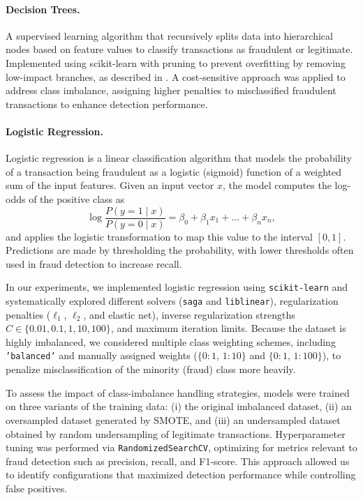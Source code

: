 \documentclass{article}
\begin{document}
    \paragraph{Decision Trees.} A supervised learning algorithm that recursively splits data into hierarchical nodes based on feature values to classify transactions as fraudulent or legitimate. Implemented using scikit-learn with pruning to prevent overfitting by removing low-impact branches, as described in \cite{tiwari2021credit}. A cost-sensitive approach was applied to address class imbalance, assigning higher penalties to misclassified fraudulent transactions to enhance detection performance.
    \paragraph{Logistic Regression.} 
Logistic regression is a linear classification algorithm that models the probability of a transaction being fraudulent as a logistic (sigmoid) function of a weighted sum of the input features. Given an input vector $x$, the model computes the log-odds of the positive class as
\[
\log \frac{P(y=1 \mid x)}{P(y=0 \mid x)} = \beta_0 + \beta_1 x_1 + \dots + \beta_n x_n,
\]
and applies the logistic transformation to map this value to the interval $[0,1]$. Predictions are made by thresholding the probability, with lower thresholds often used in fraud detection to increase recall.

In our experiments, we implemented logistic regression using \texttt{scikit-learn} and systematically explored different solvers (\texttt{saga} and \texttt{liblinear}), regularization penalties ($\ell_1$, $\ell_2$, and elastic net), inverse regularization strengths $C \in \{0.01, 0.1, 1, 10, 100\}$, and maximum iteration limits. Because the dataset is highly imbalanced, we considered multiple class weighting schemes, including \texttt{'balanced'} and manually assigned weights ($\{0:1,\, 1:10\}$ and $\{0:1,\, 1:100\}$), to penalize misclassification of the minority (fraud) class more heavily.

To assess the impact of class-imbalance handling strategies, models were trained on three variants of the training data: (i) the original imbalanced dataset, (ii) an oversampled dataset generated by SMOTE, and (iii) an undersampled dataset obtained by random undersampling of legitimate transactions. Hyperparameter tuning was performed via \texttt{RandomizedSearchCV}, optimizing for metrics relevant to fraud detection such as precision, recall, and F1-score. This approach allowed us to identify configurations that maximized detection performance while controlling false positives.
\end{document}
